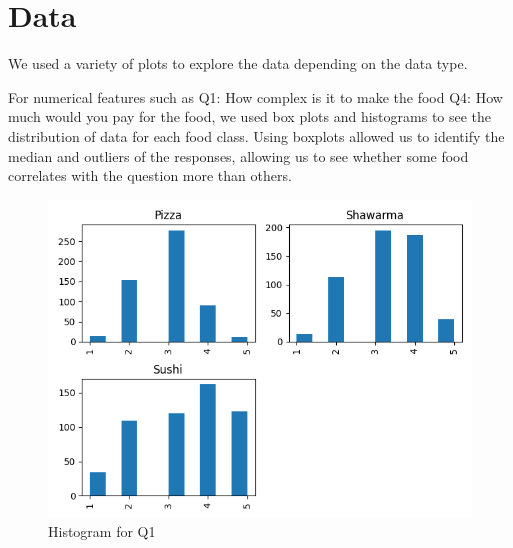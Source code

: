 \section{Data}





We used a variety of plots to explore the data depending on the data type. 

For numerical features such as Q1: How complex is it to make the food Q4: How much would you pay for the food, we used box plots and histograms to see the distribution of data for each food class. Using boxplots allowed us to identify the median and outliers of the responses, allowing us to see whether some food correlates with the question more than others. 

\begin{figure}[t!]
    \centerline{\includegraphics[width=\columnwidth]{data/histogram_Q1}}
    \caption{Histogram for Q1}
    \label{f:hist_q1}
\end{figure}

